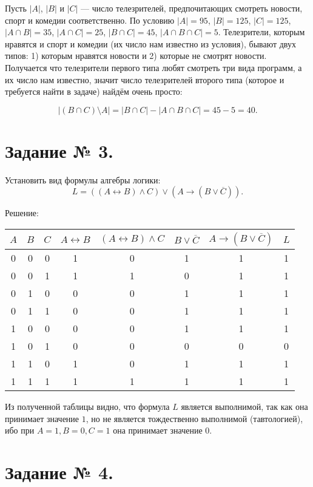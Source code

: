 \documentclass[fleqn]{article}
\begin{document}
Пусть $|A|$, $|B|$ и $|C|$ --- число телезрителей, предпочитающих смотреть новости, спорт и комедии соответственно. По условию $|A|=95$, $|B|=125$, $|C|=125$, $|A\cap B|=35$, $|A\cap C|=25$, $|B\cap C|=45$, $|A\cap B\cap C|=5$. Телезрители, которым нравятся и спорт и комедии (их число нам известно из условия), бывают двух типов: 1) которым нравятся новости и 2) которые не смотрят новости. Получается что телезрители первого типа любят смотреть три вида программ, а их число нам известно, значит число телезрителей второго типа (которое и требуется найти в задаче) найдём очень просто:

$$|(B\cap C)\setminus A|=|B\cap C|-|A\cap B\cap C|=45-5=40.$$


\section*{Задание № 3.}

Установить вид формулы алгебры логики:
$$L = ((A \leftrightarrow B) \wedge C) \vee (A \to (B \vee \overline{C} )).$$

\begin{center}Решение:\end{center}

\medskip
\begin{tabular}{|c|c|c|c|c|c|c|c|}
\hline
$A$ & $B$ & $C$ & $A \leftrightarrow B$ & $(A \leftrightarrow B) \wedge C$ & $B \vee \overline{C}$ & $A\to(B\vee\overline{C})$ & $L$ \\
\hline
0 & 0 & 0 & 1 & 0 & 1 & 1 & 1 \\
\hline
0 & 0 & 1 & 1 & 1 & 0 & 1 & 1 \\
\hline
0 & 1 & 0 & 0 & 0 & 1 & 1 & 1 \\
\hline
0 & 1 & 1 & 0 & 0 & 1 & 1 & 1 \\
\hline
1 & 0 & 0 & 0 & 0 & 1 & 1 & 1 \\
\hline
1 & 0 & 1 & 0 & 0 & 0 & 0 & 0 \\
\hline
1 & 1 & 0 & 1 & 0 & 1 & 1 & 1 \\
\hline
1 & 1 & 1 & 1 & 1 & 1 & 1 & 1 \\
\hline
\end{tabular}
\medskip

Из полученной таблицы видно, что формула $L$ является выполнимой, так как она принимает значение $1$, но не является тождественно выполнимой (тавтологией), ибо при $A=1, B=0, C=1$ она принимает значение $0$.

\section*{Задание № 4.}
\end{document}
